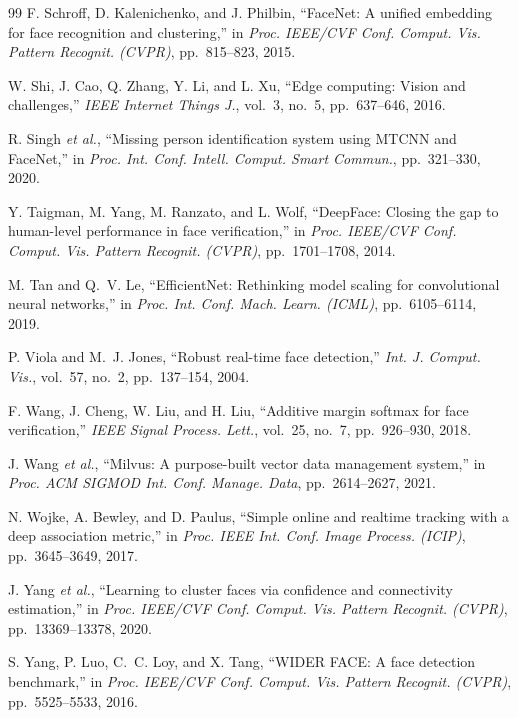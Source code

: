 \documentclass[12pt, a4paper]{article}
\begin{document}
\begin{thebibliography}{99}
F. Schroff, D. Kalenichenko, and J. Philbin, ``FaceNet: A unified embedding for face recognition and clustering,'' in \textit{Proc. IEEE/CVF Conf. Comput. Vis. Pattern Recognit. (CVPR)}, pp.~815--823, 2015.

W. Shi, J. Cao, Q. Zhang, Y. Li, and L. Xu, ``Edge computing: Vision and challenges,'' \textit{IEEE Internet Things J.}, vol.~3, no.~5, pp.~637--646, 2016.

R. Singh \textit{et al.}, ``Missing person identification system using MTCNN and FaceNet,'' in \textit{Proc. Int. Conf. Intell. Comput. Smart Commun.}, pp.~321--330, 2020.

Y. Taigman, M. Yang, M. Ranzato, and L. Wolf, ``DeepFace: Closing the gap to human-level performance in face verification,'' in \textit{Proc. IEEE/CVF Conf. Comput. Vis. Pattern Recognit. (CVPR)}, pp.~1701--1708, 2014.

M. Tan and Q.~V. Le, ``EfficientNet: Rethinking model scaling for convolutional neural networks,'' in \textit{Proc. Int. Conf. Mach. Learn. (ICML)}, pp.~6105--6114, 2019.

P. Viola and M.~J. Jones, ``Robust real-time face detection,'' \textit{Int. J. Comput. Vis.}, vol.~57, no.~2, pp.~137--154, 2004.

F. Wang, J. Cheng, W. Liu, and H. Liu, ``Additive margin softmax for face verification,'' \textit{IEEE Signal Process. Lett.}, vol.~25, no.~7, pp.~926--930, 2018.

J. Wang \textit{et al.}, ``Milvus: A purpose-built vector data management system,'' in \textit{Proc. ACM SIGMOD Int. Conf. Manage. Data}, pp.~2614--2627, 2021.

N. Wojke, A. Bewley, and D. Paulus, ``Simple online and realtime tracking with a deep association metric,'' in \textit{Proc. IEEE Int. Conf. Image Process. (ICIP)}, pp.~3645--3649, 2017.

J. Yang \textit{et al.}, ``Learning to cluster faces via confidence and connectivity estimation,'' in \textit{Proc. IEEE/CVF Conf. Comput. Vis. Pattern Recognit. (CVPR)}, pp.~13369--13378, 2020.

S. Yang, P. Luo, C.~C. Loy, and X. Tang, ``WIDER FACE: A face detection benchmark,'' in \textit{Proc. IEEE/CVF Conf. Comput. Vis. Pattern Recognit. (CVPR)}, pp.~5525--5533, 2016.


\end{thebibliography}
\end{document}
